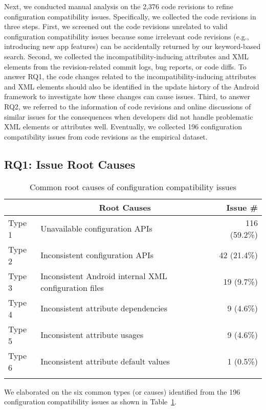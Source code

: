 {Next, we conducted manual analysis on the 2,376 code revisions to refine configuration compatibility issues. Specifically, we collected the code revisions in three steps. First, we screened out the code revisions unrelated to valid configuration compatibility issues because some irrelevant code revisions (e.g., introducing new app features) can be accidentally returned by our keyword-based search. Second, we collected the incompatibility-inducing attributes and XML elements from the revision-related commit logs, bug reports, or code diffs. 
To answer RQ1, the code changes related to the incompatibility-inducing attributes and XML elements should also be identified in the update history of the Android framework to investigate how these changes can cause issues. Third, to answer RQ2, we referred to the information of code revisions and online discussions of similar issues for the consequences when developers did not handle problematic XML elements or attributes well. Eventually, we collected 196 configuration compatibility issues from code revisions as the empirical dataset.}

\subsection{RQ1: Issue Root Causes}
\label{sec:RQ1}
\begin{table}[t]
	\caption{Common root causes of configuration compatibility issues}
	\begin{tabular}{lp{5cm}r}
		\toprule
		&\multicolumn{1}{c}{\textbf{Root Causes}}         & \textbf{Issue \#} \\ \hline
		Type 1&Unavailable configuration APIs & 116 (59.2\%)       \\
		Type 2&Inconsistent configuration APIs & 42 (21.4\%)       \\
		Type 3&Inconsistent Android internal XML configuration files & 19 (9.7\%)\\
		Type 4&Inconsistent attribute dependencies    & 9 (4.6\%)        \\
		Type 5&Inconsistent attribute usages             & 9 (4.6\%)    \\
		Type 6&Inconsistent attribute default values         & 1 (0.5\%)    \\
		\bottomrule
		\label{tab:issuecategorization}
	\end{tabular}
\end{table}

We elaborated on the six common types (or causes) identified from the 196 configuration compatibility issues as shown in Table~\ref{tab:issuecategorization}.

